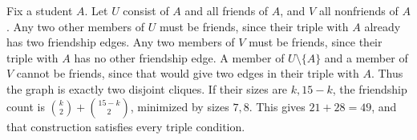 Fix a student $A$. Let $U$ consist of $A$ and all friends of $A$, and $V$ all nonfriends of $A$. Any two other members of $U$ must be friends, since their triple with $A$ already has two friendship edges. Any two members of $V$ must be friends, since their triple with $A$ has no other friendship edge. A member of $U\setminus\{A\}$ and a member of $V$ cannot be friends, since that would give two edges in their triple with $A$. Thus the graph is exactly two disjoint cliques. If their sizes are $k,15-k$, the friendship count is $\binom k2+\binom{15-k}{2}$, minimized by sizes $7,8$. This gives $21+28=\boxed{49}$, and that construction satisfies every triple condition.
